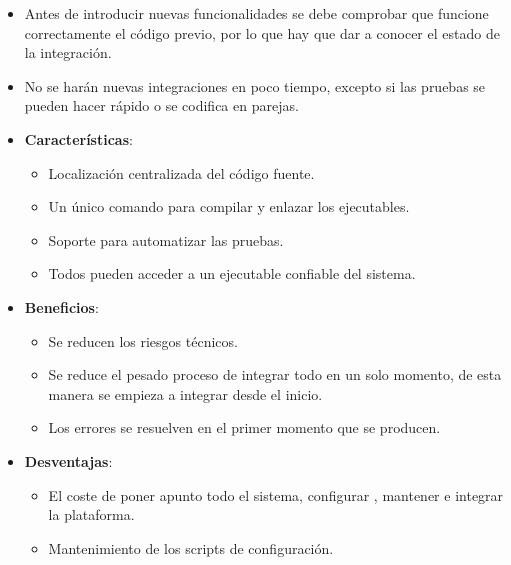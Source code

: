 \documentclass[12pt, twoside, openright]{report} %
\begin{document}
\begin{itemize}
  \begin{itemize}
  \item Antes de introducir nuevas funcionalidades se debe comprobar que
    funcione correctamente el código previo, por lo que hay que dar a
    conocer el estado de la integración.
    
  \item No se harán nuevas integraciones en poco tiempo, excepto si las
    pruebas se pueden hacer rápido o se codifica en parejas.
    
  \item \textbf{Características}:
    

    \begin{itemize}
    \item Localización centralizada del código fuente.
      
    \item Un único comando para compilar y enlazar los ejecutables.
      
    \item Soporte para automatizar las pruebas.
      
    \item Todos pueden acceder a un ejecutable confiable del sistema.
      
    \end{itemize}
  \item \textbf{Beneficios}:
    

    \begin{itemize}
    \item Se reducen los riesgos técnicos.
      
    \item Se reduce el pesado proceso de integrar todo en un solo momento,
      de esta manera se empieza a integrar desde el inicio.
      
    \item Los errores se resuelven en el primer momento que se producen.
      
    \end{itemize}
  \item \textbf{Desventajas}:
    

    \begin{itemize}
    \item El coste de poner apunto todo el sistema, configurar , mantener e
      integrar la plataforma.
      
    \item Mantenimiento de los scripts de configuración.
      

\end{itemize}
\end{itemize}
\end{itemize}
\end{document}
